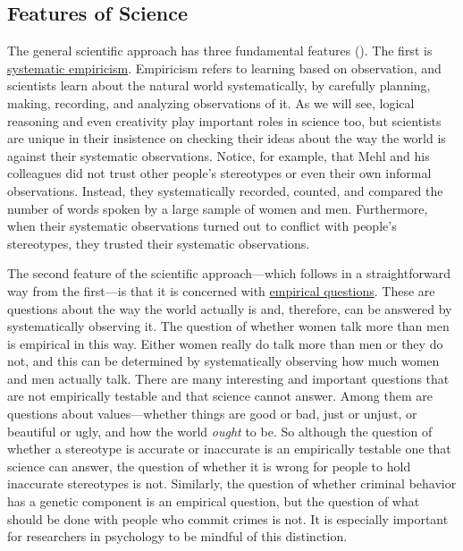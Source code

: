 \documentclass[
]{krantz}
\begin{document}
\subsection*{Features of Science}\label{features-of-science}


The general scientific approach has three fundamental features (). The first is \hyperref[systematic-empiricism]{systematic empiricism}. Empiricism refers to learning based on observation, and scientists learn about the natural world systematically, by carefully planning, making, recording, and analyzing observations of it. As we will see, logical reasoning and even creativity play important roles in science too, but scientists are unique in their insistence on checking their ideas about the way the world is against their systematic observations. Notice, for example, that Mehl and his colleagues did not trust other people's stereotypes or even their own informal observations. Instead, they systematically recorded, counted, and compared the number of words spoken by a large sample of women and men. Furthermore, when their systematic observations turned out to conflict with people's stereotypes, they trusted their systematic observations.

The second feature of the scientific approach---which follows in a straightforward way from the first---is that it is concerned with \hyperref[empirical-question]{empirical questions}. These are questions about the way the world actually is and, therefore, can be answered by systematically observing it. The question of whether women talk more than men is empirical in this way. Either women really do talk more than men or they do not, and this can be determined by systematically observing how much women and men actually talk. There are many interesting and important questions that are not empirically testable and that science cannot answer. Among them are questions about values---whether things are good or bad, just or unjust, or beautiful or ugly, and how the world \emph{ought} to be. So although the question of whether a stereotype is accurate or inaccurate is an empirically testable one that science can answer, the question of whether it is wrong for people to hold inaccurate stereotypes is not. Similarly, the question of whether criminal behavior has a genetic component is an empirical question, but the question of what should be done with people who commit crimes is not. It is especially important for researchers in psychology to be mindful of this distinction.
\end{document}

